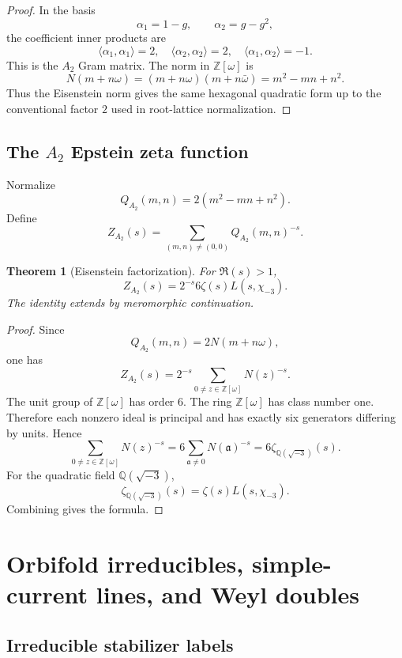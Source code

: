 \documentclass[11pt]{amsart}
\newtheorem{theorem}{Theorem}[section]
\newcommand{\ZZ}{\mathbb Z}
\newcommand{\QQ}{\mathbb Q}
\begin{document}
\begin{proof}
In the basis
\[
        \alpha_1=1-g,
        \qquad
        \alpha_2=g-g^2,
\]
the coefficient inner products are
\[
        \langle \alpha_1,\alpha_1\rangle=2,
        \quad
        \langle \alpha_2,\alpha_2\rangle=2,
        \quad
        \langle \alpha_1,\alpha_2\rangle=-1.
\]
This is the $A_2$ Gram matrix.  The norm in $\ZZ[\omega]$ is
\[
        N(m+n\omega)=(m+n\omega)(m+n\bar\omega)=m^2-mn+n^2.
\]
Thus the Eisenstein norm gives the same hexagonal quadratic form up to the conventional factor $2$ used in root-lattice normalization.\end{proof}

\subsection{The $A_2$ Epstein zeta function}

Normalize
\[
        Q_{A_2}(m,n)=2(m^2-mn+n^2).
\]
Define
\[
        Z_{A_2}(s)=\sum_{(m,n)\ne(0,0)}Q_{A_2}(m,n)^{-s}.
\]

\begin{theorem}[Eisenstein factorization]
For $\Re(s)>1$,
\[
        Z_{A_2}(s)=2^{-s}6\zeta(s)L(s,\chi_{-3}).
\]
The identity extends by meromorphic continuation.
\end{theorem}

\begin{proof}
Since
\[
        Q_{A_2}(m,n)=2N(m+n\omega),
\]
one has
\[
        Z_{A_2}(s)=2^{-s}\sum_{0\ne z\in\ZZ[\omega]}N(z)^{-s}.
\]
The unit group of $\ZZ[\omega]$ has order $6$.  The ring $\ZZ[\omega]$ has class number one.  Therefore each nonzero ideal is principal and has exactly six generators differing by units.  Hence
\[
        \sum_{0\ne z\in\ZZ[\omega]}N(z)^{-s}
        =6\sum_{\mathfrak a\ne0}N(\mathfrak a)^{-s}
        =6\zeta_{\QQ(\sqrt{-3})}(s).
\]
For the quadratic field $\QQ(\sqrt{-3})$,
\[
        \zeta_{\QQ(\sqrt{-3})}(s)=\zeta(s)L(s,\chi_{-3}).
\]
Combining gives the formula.\end{proof}

\section{Orbifold irreducibles, simple-current lines, and Weyl doubles}

\subsection{Irreducible stabilizer labels}
\end{document}

